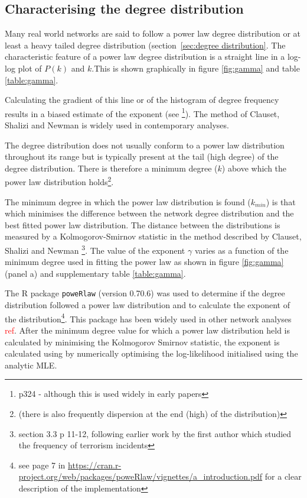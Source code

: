 \subsection{Characterising the degree distribution}
\label{sec: Methods degree distribution}
Many real world networks are said to follow a power law degree distribution or at least a heavy tailed degree distribution (section~\ref{sec:degree distribution}. The characteristic feature of a power law degree distribution is a straight line in a log-log plot of $ P(k)$ and $k$.This is shown graphically in figure \ref{fig:gamma} and table \ref{table:gamma}.

 Calculating the gradient of this line or of the histogram of degree frequency results in a biased estimate of the exponent (see \cite{newman2018networks}\footnote{p324 - although this is used widely in early papers}). The method of Clauset, Shalizi and Newman\cite{clauset2009power} is widely used in contemporary analyses.

The  degree distribution does not usually conform to a power law distribution throughout its range but is typically present at the tail (high degree) of the degree distribution\cite{newman2018networks}. There is therefore a minimum degree ($k$) above which the power law distribution holds\footnote{(there is also frequently dispersion at the end (high) of the distribution)}. 

The minimum degree in which the power law distribution is found ($k_{min}$) is that which minimises the difference between the network degree distribution and the best fitted power law distribution. The distance between the distributions is measured by a Kolmogorov-Smirnov statistic in the method described by Clauset, Shalizi and Newman \cite{clauset2009power}\footnote{section 3.3 p 11-12, following earlier work by the first author \cite{clauset2007frequency} which studied the frequency of terrorism incidents}. The value of the exponent $\gamma$ varies as a function of the minimum degree used in fitting the power law as shown in figure \ref{fig:gamma} (panel a) and supplementary table \ref{table:gamma}.

The R package \texttt{poweRlaw} (version 0.70.6)\cite{gillespie2015fitting} was used to determine if the degree distribution followed a power law distribution and to calculate the exponent of the distribution\footnote{see page 7 in \url{https://cran.r-project.org/web/packages/poweRlaw/vignettes/a_introduction.pdf} for a clear description of the implementation}. This package has been widely used in other network analyses \textcolor{red}{ref}. After the minimum degree value for which a power law distribution held is calculated by minimising the Kolmogorov Smirnov statistic, the exponent is calculated using by numerically optimising the log-likelihood initialised using the analytic MLE\cite{gillespie2015fitting}.


